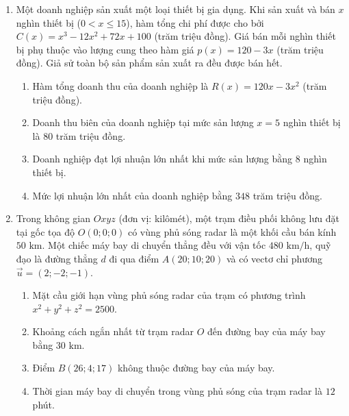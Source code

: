 \documentclass[12pt,a4paper]{article}
\begin{document}
\begin{enumerate}
\item Một doanh nghiệp sản xuất một loại thiết bị gia dụng. Khi sản xuất và bán $x$ nghìn thiết bị ($0 < x \le 15$), hàm tổng chi phí được cho bởi $C(x) = x^3 - 12x^2 + 72x + 100$ (trăm triệu đồng). Giá bán mỗi nghìn thiết bị phụ thuộc vào lượng cung theo hàm giá $p(x) = 120 - 3x$ (trăm triệu đồng). Giả sử toàn bộ sản phẩm sản xuất ra đều được bán hết.
\begin{enumerate}
\item Hàm tổng doanh thu của doanh nghiệp là $R(x) = 120x - 3x^2$ (trăm triệu đồng).
\item Doanh thu biên của doanh nghiệp tại mức sản lượng $x = 5$ nghìn thiết bị là $80$ trăm triệu đồng.
\item Doanh nghiệp đạt lợi nhuận lớn nhất khi mức sản lượng bằng $8$ nghìn thiết bị.
\item Mức lợi nhuận lớn nhất của doanh nghiệp bằng $348$ trăm triệu đồng.
\end{enumerate}

\item \begin{minipage}[t]{0.56\linewidth}
Trong không gian $Oxyz$ (đơn vị: kilômét), một trạm điều phối không lưu đặt tại gốc tọa độ $O(0; 0; 0)$ có vùng phủ sóng radar là một khối cầu bán kính $50\text{ km}$. Một chiếc máy bay di chuyển thẳng đều với vận tốc $480\text{ km/h}$, quỹ đạo là đường thẳng $d$ đi qua điểm $A(20; 10; 20)$ và có vectơ chỉ phương $\vec{u} = (2; -2; -1)$.
\begin{enumerate}
\item Mặt cầu giới hạn vùng phủ sóng radar của trạm có phương trình $x^2 + y^2 + z^2 = 2500$.
\item Khoảng cách ngắn nhất từ trạm radar $O$ đến đường bay của máy bay bằng $30\text{ km}$.
\item Điểm $B(26; 4; 17)$ không thuộc đường bay của máy bay.
\item Thời gian máy bay di chuyển trong vùng phủ sóng của trạm radar là $12$ phút.
\end{enumerate}
\end{minipage}\hfill
\begin{minipage}[t]{0.41\linewidth}
\vspace{-0.3\baselineskip}
\centering
{}
\end{minipage}


\end{enumerate}
\end{document}
